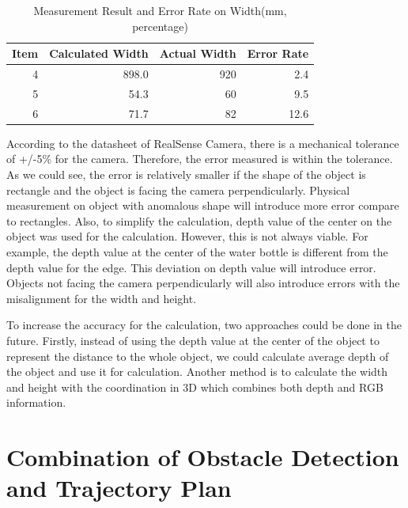 \documentclass[
  oneside]{ubcthesis}
\begin{document}
\begin{table}

\caption{\label{tab:mytable5}Measurement Result and Error Rate on Width(mm, percentage)}
\centering
\begin{tabular}[t]{rrrr}
\toprule
Item & Calculated Width & Actual Width & Error Rate\\
\midrule
4 & 898.0 & 920 & 2.4\\
5 & 54.3 & 60 & 9.5\\
6 & 71.7 & 82 & 12.6\\
\bottomrule
\end{tabular}
\end{table}

According to the datasheet \citep{realSenseD400} of RealSense Camera, there is a mechanical tolerance of +/-5\% for the camera. Therefore, the error measured is within the tolerance. As we could see, the error is relatively smaller if the shape of the object is rectangle and the object is facing the camera perpendicularly. Physical measurement on object with anomalous shape will introduce more error compare to rectangles. Also, to simplify the calculation, depth value of the center on the object was used for the calculation. However, this is not always viable. For example, the depth value at the center of the water bottle is different from the depth value for the edge. This deviation on depth value will introduce error. Objects not facing the camera perpendicularly will also introduce errors with the misalignment for the width and height.

To increase the accuracy for the calculation, two approaches could be done in the future. Firstly, instead of using the depth value at the center of the object to represent the distance to the whole object, we could calculate average depth of the object and use it for calculation. Another method is to calculate the width and height with the coordination in 3D which combines both depth and RGB information.

\hypertarget{combination-of-obstacle-detection-and-trajectory-plan}{%
\section{Combination of Obstacle Detection and Trajectory Plan}\label{combination-of-obstacle-detection-and-trajectory-plan}}
\end{document}
